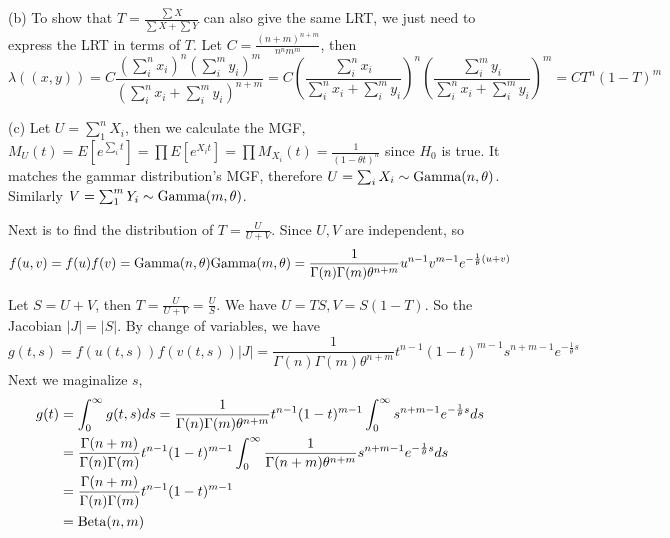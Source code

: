 \documentclass[12pt]{article}
\begin{document}
(b) To show that $T = \frac{\sum X}{\sum X + \sum Y}$ can also give the same LRT, we just need to express the LRT in terms of $T$. Let $C= \frac{(n+m)^{n+m}}{n^nm^m}$, then
$$\lambda((x, y)) =C \frac{\left(\sum_i^nx_i\right)^n \left(\sum_i^m y_i\right)^m}{\left(\sum_i^nx_i +  \sum_i^m y_i \right)^{n+m}} 
= C  \left(\frac{\sum_i^nx_i}{\sum_i^nx_i +  \sum_i^m y_i}\right)^n \left(\frac{\sum_i^m y_i}{\sum_i^nx_i +  \sum_i^m y_i}\right)^m  = C T^n (1 - T)^m $$

(c)
Let $U = \sum^{n}_{1} X_i$, then we calculate the MGF,  $M_U(t) = E\left[e^{\sum_i t}\right] = \prod E\left[e^{X_it}\right]=\prod M_{X_i}(t) = \frac{1}{(1 - \theta t)^n}$ since $H_0$ is true. It matches the gammar distribution's MGF, therefore $U = \sum_i X_i \sim \text{Gamma}(n, \theta)$. Similarly $V = \sum^m_1 Y_i \sim \text{Gamma}(m, \theta)$.

Next is to find the distribution of $T  = \frac{U}{U + V}$. Since $U, V$ are independent, so $$f(u, v) = f(u) f(v) = \text{Gamma}(n, \theta)\text{Gamma}(m, \theta) = \frac{1}{\Gamma(n)\Gamma(m) \theta^{n+m}} u^{n-1}v^{m-1} e^{-\frac{1}{\theta}(u + v)}$$

Let $S = U + V$, then $T = \frac{U}{U + V} = \frac{U}{S}$. We have $U = TS,  V = S(1-T)$. So the Jacobian $|J| = |S|$. By change of variables, we have 
$$ g(t, s) = f(u(t, s)) f(v(t, s)) |J| = \frac{1}{\Gamma(n)\Gamma(m) \theta^{n+m}} t^{n-1}(1-t)^{m-1} s^{n + m-1} e^{-\frac{1}{\theta}s}$$
Next we maginalize $s$, 
\begin{equation*}
 \begin{split}
	g(t) &= \int_{0}^{\infty} g(t, s) ds =  \frac{1}{\Gamma(n)\Gamma(m)\theta^{n+m}}  t^{n-1}(1-t)^{m-1} \int_{0}^{\infty} s^{n + m-1} e^{-\frac{1}{\theta}s}ds \\ 
	&= \frac{\Gamma(n+m)}{\Gamma(n)\Gamma(m)} t^{n-1}(1-t)^{m-1} \int_0^\infty \frac{1}{\Gamma(n + m) \theta^{n+m}} s^{n + m-1} e^{-\frac{1}{\theta}s}ds \\
	&=  \frac{\Gamma(n+m)}{\Gamma(n)\Gamma(m)} t^{n-1}(1-t)^{m-1} \\
	&= \text{Beta}(n, m)
\end{split}
\end{equation*}
\end{document}
